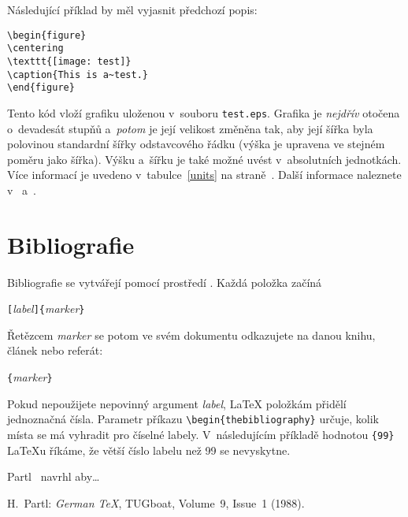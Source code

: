 Následující příklad by měl vyjasnit předchozí popis:
\begin{code}
\begin{verbatim}
\begin{figure}
\centering
\texttt{[image: test]}
\caption{This is a~test.}
\end{figure}
\end{verbatim}
\end{code}
Tento kód vloží grafiku uloženou v~souboru \texttt{test.eps}.
Grafika je \emph{nejdřív} otočena o~devadesát stupňů
a~\emph{potom} je její velikost změněna tak, aby její šířka
byla polovinou standardní šířky odstavcového řádku (výška
je upravena ve stejném poměru jako šířka). Výšku a~šířku
je také možné uvést v~absolutních jednotkách. Více informací
je uvedeno v~tabulce~\ref{units} na straně~\pageref{units}.
Další informace naleznete v~\cite{graphics} a~\cite{eps}.

\section{Bibliografie}
 
Bibliografie se vytvářejí pomocí prostředí .
Každá položka začíná
\begin{lscommand}
\verb|[|\emph{label}\verb|]{|\emph{marker}\verb|}|
\end{lscommand}
Řetězcem \emph{marker} se potom ve svém dokumentu odkazujete
na danou knihu, článek nebo referát:
\begin{lscommand}
\verb|{|\emph{marker}\verb|}|
\end{lscommand}
Pokud nepoužijete nepovinný argument \emph{label}, \LaTeX{} položkám
přidělí jednoznačná čísla. Parametr příkazu
\verb|\begin{thebibliography}| určuje, kolik místa se má vyhradit
pro číselné labely. V~následujícím příkladě hodnotou \verb|{99}|
\LaTeX u říkáme, že větší číslo labelu než 99 se nevyskytne.
\enlargethispage{2cm}
\begin{example}
Partl~\cite{pa}
navrhl aby\ldots 
\begin{thebibliography}{99}
 H.~Partl: 
\emph{German \TeX},
TUGboat, Volume~9, Issue~1 (1988).
\end{thebibliography}
\end{example}

\thispagestyle{fancyplain}


